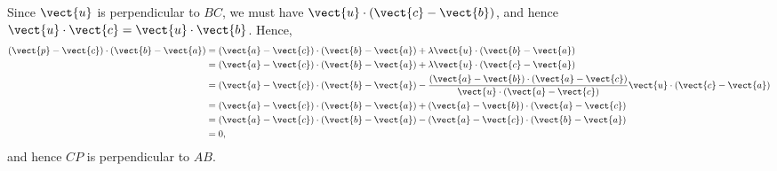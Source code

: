 Since \(\vect{u}\) is perpendicular to \(BC\), we must have \(\vect{u} \cdot (\vect{c} - \vect{b})\), and hence \(\vect{u} \cdot \vect{c} = \vect{u} \cdot \vect{b}\). Hence,
\begin{align*}
    (\vect{p} - \vect{c}) \cdot (\vect{b} - \vect{a}) & = \left(\vect{a} - \vect{c}\right) \cdot (\vect{b} - \vect{a}) + \lambda \vect{u} \cdot \left(\vect{b} - \vect{a}\right)                                                                                        \\
                                                      & = \left(\vect{a} - \vect{c}\right) \cdot (\vect{b} - \vect{a}) + \lambda \vect{u} \cdot \left(\vect{c} - \vect{a}\right)                                                                                        \\
                                                      & = \left(\vect{a} - \vect{c}\right) \cdot (\vect{b} - \vect{a}) - \frac{(\vect{a} - \vect{b}) \cdot (\vect{a} - \vect{c})}{\vect{u} \cdot (\vect{a} - \vect{c})} \vect{u} \cdot \left(\vect{c} - \vect{a}\right) \\
                                                      & = \left(\vect{a} - \vect{c}\right) \cdot (\vect{b} - \vect{a}) + (\vect{a} - \vect{b}) \cdot (\vect{a} - \vect{c})                                                                                              \\
                                                      & = \left(\vect{a} - \vect{c}\right) \cdot (\vect{b} - \vect{a}) - (\vect{a} - \vect{c}) \cdot (\vect{b} - \vect{a})                                                                                              \\
                                                      & = 0,
\end{align*}
and hence \(CP\) is perpendicular to \(AB\).